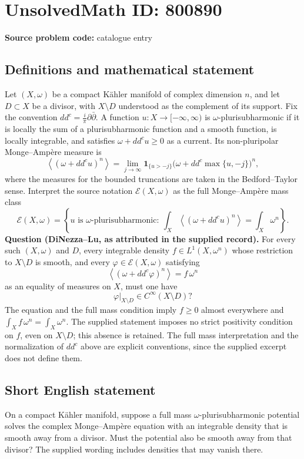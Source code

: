 \documentclass[11pt]{article}
\begin{document}
\section*{UnsolvedMath ID: 800890}
\textbf{Source problem code:} catalogue entry
\subsection{Definitions and mathematical statement}
Let \((X,\omega)\) be a compact K\"ahler manifold of complex dimension \(n\), and let \(D\subset X\) be a divisor, with \(X\setminus D\) understood as the complement of its support. Fix the convention \(dd^c=\frac{i}{\pi}\partial\bar\partial\). A function \(u\colon X\to[-\infty,\infty)\) is \(\omega\)-plurisubharmonic if it is locally the sum of a plurisubharmonic function and a smooth function, is locally integrable, and satisfies \(\omega+dd^c u\geq 0\) as a current. Its non-pluripolar Monge--Amp\`ere measure is
\[
\left\langle(\omega+dd^c u)^n\right\rangle
=\lim_{j\to\infty}\mathbf{1}_{\{u>-j\}}
\bigl(\omega+dd^c\max\{u,-j\}\bigr)^n,
\]
where the measures for the bounded truncations are taken in the Bedford--Taylor sense. Interpret the source notation \(\mathcal E(X,\omega)\) as the full Monge--Amp\`ere mass class
\[
\mathcal E(X,\omega)=\left\{u\text{ is }\omega\text{-plurisubharmonic}:\ 
\int_X\left\langle(\omega+dd^c u)^n\right\rangle
=\int_X\omega^n\right\}.
\]
\textbf{Question (DiNezza--Lu, as attributed in the supplied record).} For every such \((X,\omega)\) and \(D\), every integrable density \(f\in L^1(X,\omega^n)\) whose restriction to \(X\setminus D\) is smooth, and every \(\varphi\in\mathcal E(X,\omega)\) satisfying
\[
\left\langle(\omega+dd^c\varphi)^n\right\rangle=f\,\omega^n
\]
as an equality of measures on \(X\), must one have
\[
\varphi|_{X\setminus D}\in C^\infty(X\setminus D)?
\]
The equation and the full mass condition imply \(f\geq0\) almost everywhere and \(\int_X f\,\omega^n=\int_X\omega^n\). The supplied statement imposes no strict positivity condition on \(f\), even on \(X\setminus D\); this absence is retained. The full mass interpretation and the normalization of \(dd^c\) above are explicit conventions, since the supplied excerpt does not define them.
\subsection{Short English statement}
On a compact K\"ahler manifold, suppose a full mass \(\omega\)-plurisubharmonic potential solves the complex Monge--Amp\`ere equation with an integrable density that is smooth away from a divisor. Must the potential also be smooth away from that divisor? The supplied wording includes densities that may vanish there.
\end{document}
